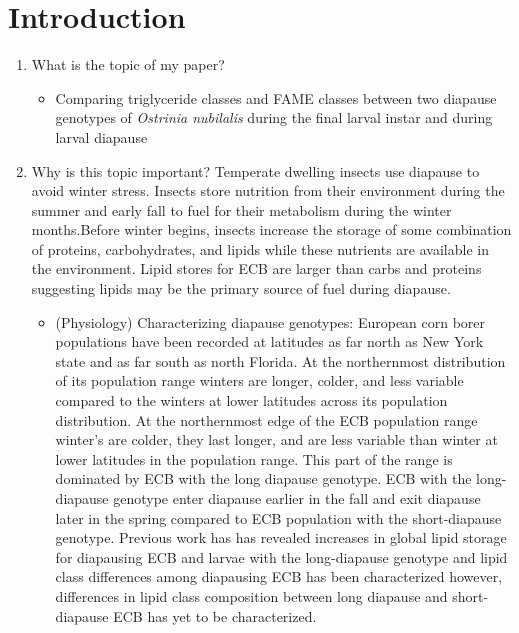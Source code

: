 \documentclass[review]{elsarticle}
\begin{document}
\linenumbers



\section{Introduction}
\begin{enumerate}
\item What is the topic of my paper?
\begin{itemize}
\item Comparing triglyceride classes and FAME classes between two diapause genotypes of \textit{Ostrinia nubilalis} during the final larval instar and during larval diapause
\end{itemize}

\item Why is this topic important?
Temperate dwelling insects use diapause to avoid winter stress. Insects store nutrition from their environment during the summer and early fall to fuel for their metabolism during the winter months.Before winter begins, insects increase the storage of some combination of proteins, carbohydrates, and lipids while these nutrients are available in the environment. Lipid stores for ECB are larger than carbs and proteins suggesting lipids may be the primary source of fuel during diapause. 
\begin{itemize}
\item (Physiology) Characterizing diapause genotypes: European corn borer populations have been recorded at latitudes as far north as New York state and as far south as north Florida. At the northernmost distribution of its population range winters are longer, colder, and less variable compared to the winters at lower latitudes across its population distribution. At the northernmost edge of the ECB population range winter's are colder, they last longer, and are less variable than winter at lower latitudes in the population range. This part of the range is dominated by ECB with the long diapause genotype. ECB with the long-diapause genotype enter diapause earlier in the fall and exit diapause later in the spring compared to ECB population with the short-diapause genotype. Previous work has has revealed increases in global lipid storage for diapausing ECB and larvae with the long-diapause genotype and lipid class differences among diapausing ECB has been characterized however, differences in lipid class composition between long diapause and short-diapause ECB has yet to be characterized.

\end{itemize}
\end{enumerate}
\end{document}

